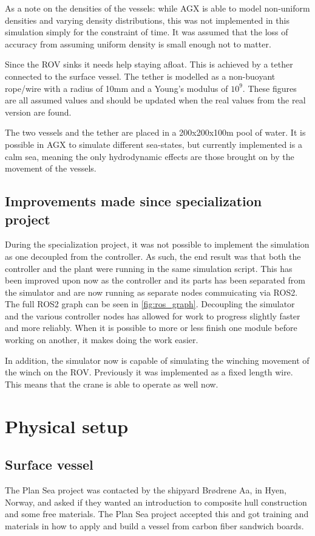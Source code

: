 \documentclass[class=article, crop=false]{standalone}
\begin{document}
As a note on the densities of the vessels: while AGX is able to model non-uniform densities and varying density distributions, this was not implemented in this simulation simply for the constraint of time. It was assumed that the loss of accuracy from assuming uniform density is small enough not to matter.

Since the ROV sinks it needs help staying afloat. This is achieved by a tether connected to the surface vessel. The tether is modelled as a non-buoyant rope/wire with a radius of 10mm and a Young's modulus of \(10^9\). These figures are all assumed values and should be updated when the real values from the real version are found.

The two vessels and the tether are placed in a 200x200x100m pool of water. It is possible in AGX to simulate different sea-states, but currently implemented is a calm sea, meaning the only hydrodynamic effects are those brought on by the movement of the vessels.


\subsection{Improvements made since specialization project}
During the specialization project, it was not possible to implement the simulation as one decoupled from the controller. As such, the end result was that both the controller and the plant were running in the same simulation script. This has been improved upon now as the controller and its parts has been separated from the simulator and are now running as separate nodes commuicating via ROS2. The full ROS2 graph can be seen in \cref{fig:ros_graph}. Decoupling the simulator and the various controller nodes has allowed for work to progress slightly faster and more reliably. When it is possible to more or less finish one module before working on another, it makes doing the work easier.

In addition, the simulator now is capable of simulating the winching movement of the winch on the ROV. Previously it was implemented as a fixed length wire. This means that the crane is able to operate as well now.

\section{Physical setup}
\subsection{Surface vessel}
The Plan Sea project was contacted by the shipyard Brødrene Aa, in Hyen, Norway, and asked if they wanted an introduction to composite hull construction and some free materials. The Plan Sea project accepted this and got training and materials in how to apply and build a vessel from carbon fiber sandwich boards.
\end{document}
